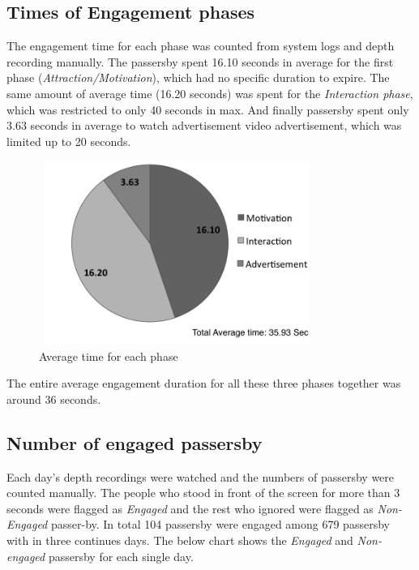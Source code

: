 \subsection{Times of Engagement phases}
The engagement time for each phase was counted from system logs and depth recording manually. The passersby spent 16.10 seconds in average for the first phase (\emph{Attraction/Motivation}), which had no specific duration to expire.  The same amount of average time (16.20 seconds) was spent for the \emph{Interaction phase}, which was restricted to only 40 seconds in max. And finally passersby spent only 3.63 seconds in average to watch advertisement video advertisement, which was limited up to 20 seconds.

\begin{figure}[H]
    \centering
    \includegraphics[width=90mm,height=60mm]{Figures/9/avg_phases}
    \caption{Average time for each phase}%
    \label{fig:newbodyaveragephases}%
\end{figure}

The entire average engagement duration for all these three phases together was around 36 seconds.


\subsection{Number of engaged passersby}
Each day’s depth recordings were watched and the numbers of passersby were counted manually. The people who stood in front of the screen for more than 3 seconds were flagged as \emph{Engaged} and the rest who ignored were flagged as \emph{Non-Engaged} passer-by. In total 104 passersby were engaged among 679 passersby with in three continues days. The below chart shows the \emph{Engaged} and \emph{Non-engaged} passersby for each single day.

